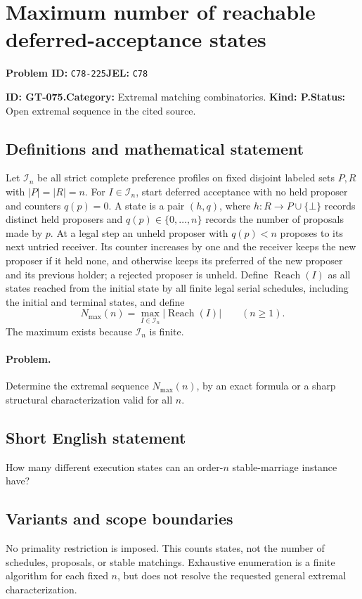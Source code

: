 \documentclass[11pt,a4paper]{article}
\begin{document}
\section*{Maximum number of reachable deferred-acceptance states}
\textbf{Problem ID:} \texttt{C78-225}\quad \textbf{JEL:} \texttt{C78}\par
\label{problem:OP-0205}
\label{game:GT-075}
{\sffamily\small\color{muted}
\noindent\textbf{ID: GT-075.}\quad\textbf{Category:} Extremal matching combinatorics.
\quad\textbf{Kind: P.}\quad\textbf{Status:} Open extremal sequence in the cited source.
\par}
\subsection*{Definitions and mathematical statement}
Let \(\mathcal I_n\) be all strict complete preference profiles on fixed
disjoint labeled sets \(P,R\) with \(|P|=|R|=n\).
For \(I\in\mathcal I_n\), start deferred acceptance with no held proposer
and counters \(q(p)=0\). A state is a pair \((h,q)\), where
\(h:R\to P\cup\{\bot\}\) records distinct held proposers and
\(q(p)\in\{0,\ldots,n\}\) records the number of proposals made by \(p\).
At a legal step an unheld proposer with \(q(p)<n\) proposes to its
next untried receiver. Its counter increases by one and the receiver
keeps the new proposer if it held none, and otherwise keeps its preferred
of the new proposer and its previous holder;
a rejected proposer is unheld.
Define \(\operatorname{Reach}(I)\) as all states reached from the
initial state by all finite legal serial schedules, including the
initial and terminal states, and define
\[
 N_{\max}(n)=
       \max_{I\in\mathcal I_n}|\operatorname{Reach}(I)|\qquad(n\geq 1).
\]
The maximum exists because \(\mathcal I_n\) is finite.

\paragraph{Problem.}
Determine the extremal sequence \(N_{\max}(n)\), by an exact formula
or a sharp structural characterization valid for all \(n\).

\subsection*{Short English statement}
How many different execution states can an order-\(n\) stable-marriage
instance have?

\subsection*{Variants and scope boundaries}
No primality restriction is imposed. This counts states, not the number
of schedules, proposals, or stable matchings. Exhaustive enumeration is
a finite algorithm for each fixed \(n\), but does not resolve the requested
general extremal characterization.
\end{document}
